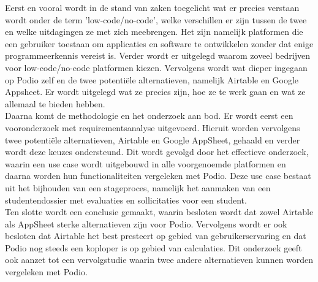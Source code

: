 Eerst en vooral wordt in de stand van zaken toegelicht wat er precies verstaan wordt onder de term 'low-code/no-code', welke verschillen er zijn tussen de twee en welke uitdagingen ze met zich meebrengen. Het zijn namelijk platformen die een gebruiker toestaan om applicaties en software te ontwikkelen zonder dat enige programmeerkennis vereist is. Verder wordt er uitgelegd waarom zoveel bedrijven voor low-code/no-code platformen kiezen. Vervolgens wordt wat dieper ingegaan op Podio zelf en de twee potentiële alternatieven, namelijk Airtable en Google Appsheet. Er wordt uitgelegd wat ze precies zijn, hoe ze te werk gaan en wat ze allemaal te bieden hebben. \\

Daarna komt de methodologie en het onderzoek aan bod. Er wordt eerst een vooronderzoek met requirementsanalyse uitgevoerd. Hieruit worden vervolgens twee potentiële alternatieven, Airtable en Google AppSheet, gehaald en verder wordt deze keuzes ondersteund. Dit wordt gevolgd door het effectieve onderzoek, waarin een use case wordt uitgebouwd in alle voorgenoemde platformen en daarna worden hun functionaliteiten vergeleken met Podio. Deze use case bestaat uit het bijhouden van een stageproces, namelijk het aanmaken van een studentendossier met evaluaties en sollicitaties voor een student. \\ 

Ten slotte wordt een conclusie gemaakt, waarin besloten wordt dat zowel Airtable als AppSheet sterke alternatieven zijn voor Podio. Vervolgens wordt er ook besloten dat Airtable het best presteert op gebied van gebruikerservaring en dat Podio nog steeds een koploper is op gebied van calculaties. Dit onderzoek geeft ook aanzet tot een vervolgstudie waarin twee andere alternatieven kunnen worden vergeleken met Podio. \\

